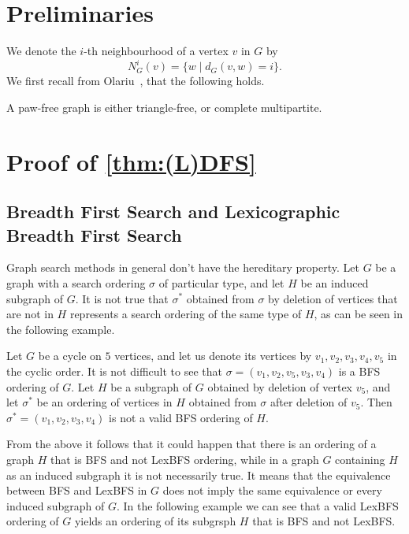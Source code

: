 \documentclass{svproc}
\begin{document}



\ifshort
\newpage
\appendix

\section{Preliminaries}
We denote the $i$-th neighbourhood of a vertex $v$ in $G$ by 
$$
N_G^i(v)=\{w\mid d_G(v,w)=i\}.
$$
We first recall from Olariu~\cite{olariu1988paw}, that the following holds.
\begin{theorem}
\label{thm:olariu}
A paw-free graph is either triangle-free, or complete multipartite. 
\end{theorem}


\section{Proof of \cref{thm:(L)DFS}}\label{sec:pan-diamond}

\subsection{Breadth First Search and Lexicographic Breadth First Search}

Graph search methods in general don't have the hereditary property. Let $G$ be a graph with a search ordering $\sigma$ of particular type, and let $H$ be an induced subgraph of $G$. It is not true that $\sigma^*$ obtained from $\sigma$ by deletion of vertices that are not in $H$ represents a search ordering of the same type of $H$, as can be seen in the following example. 

\begin{example}
Let $G$ be a cycle on $5$ vertices, and let us denote its vertices by $v_1,v_2,v_3,v_4,v_5$ in the cyclic order. It is not difficult to see that $\sigma=(v_1,v_2,v_5,v_3,v_4)$ is a BFS ordering of $G$. Let $H$ be a subgraph of $G$ obtained by deletion of vertex $v_5$, and let $\sigma^*$ be an ordering of vertices in $H$ obtained from $\sigma$ after deletion of $v_5$. Then $\sigma^*=(v_1,v_2,v_3,v_4)$ is not a valid BFS ordering of $H$. 
\end{example}

From the above it follows that it could happen that there is an ordering of a graph $H$ that is BFS and not LexBFS ordering, while in a graph $G$ containing $H$ as an induced subgraph it is not necessarily true. It means that the equivalence between BFS and LexBFS in $G$ does not imply the same equivalence or every induced subgraph of $G$. In the following example we can see that a valid LexBFS ordering of $G$ yields an ordering of its subgrsph $H$ that is BFS and not LexBFS. 
\end{document}
